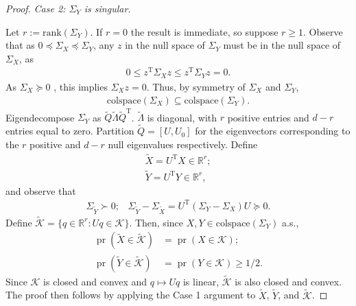 \documentclass[11pt]{article}
\def\T{{ \mathrm{\scriptscriptstyle T} }}
\newcommand{\1}{\mathbbm{1}}
\theoremstyle{plain}
\theoremstyle{definition}
\begin{document}
\begin{proof}
\medskip
\noindent\textit{Case 2: $\Sigma_Y$ is singular.}

Let $r := \text{rank}(\Sigma_Y)$. If $r=0$ the result is immediate, so suppose $r\geq 1$. Observe that as $0\preceq\Sigma_X\preceq\Sigma_Y$, any $z$ in the null space of $\Sigma_Y$ must be in the null space of $\Sigma_X$, as
\begin{align*} 0\leq z^\T\Sigma_X z\leq z^\T\Sigma_Y z = 0.\end{align*} As $\Sigma_X\succeq 0$ , this implies $\Sigma_Xz = 0$. Thus, by symmetry of $\Sigma_X$ and $\Sigma_Y$, 
\begin{align*}\text{colspace}(\Sigma_X)\subseteq \text{colspace}(\Sigma_Y).\end{align*} Eigendecompose $\Sigma_Y$ as $\tilde{Q}\tilde{\Lambda} \tilde{Q}^\T$. $\tilde{\Lambda}$ is diagonal, with $r$ positive entries and $d-r$ entries equal to zero. Partition $\tilde{Q}=[U,U_0]$ for the eigenvectors corresponding to the $r$ positive and $d-r$ null eigenvalues respectively. Define 
\begin{align*} \tilde{X} = U^\T X \in \mathbb{R}^r;\\\tilde{Y} = U^\T Y \in \mathbb{R}^r,\end{align*} and observe that 
\begin{align*} \Sigma_{\tilde{Y}}\succ 0;\;\;\;\Sigma_{\tilde{Y}} - \Sigma_{\tilde{X}} = U^\T(\Sigma_Y-\Sigma_X)U \succeq 0.\end{align*}Define $\tilde{\mathcal{K}} = \{q\in\mathbb{R}^r: U q \in \mathcal{K}\}$.  Then, since $X, Y \in \text{colspace}(\Sigma_Y)$ a.s., 
\begin{align*}\operatorname{pr}(\tilde{X}\in \tilde{\mathcal{K}}) &= \operatorname{pr}(X\in \mathcal{K});\\ \operatorname{pr}(\tilde{Y}\in \tilde{\mathcal{K}}) &= \operatorname{pr}(Y\in \mathcal{K})\geq 1/2.\end{align*} 
Since $\mathcal{K}$ is closed and convex and $q\mapsto Uq$ is linear, $\tilde{\mathcal{K}}$ is also closed and convex. The proof then follows by applying the Case 1 argument to $\tilde{X}$, $\tilde{Y}$, and $\tilde{\mathcal{K}}$. 
\end{proof}
\end{document}
